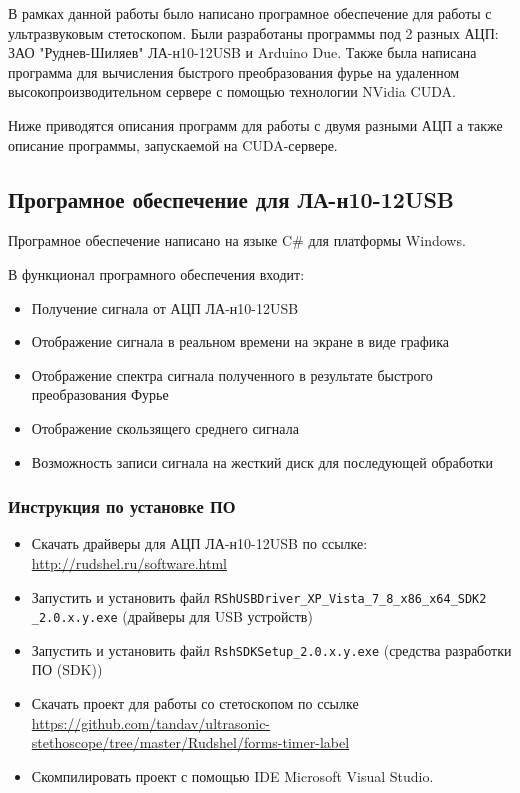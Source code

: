 \documentclass[../paper.tex]{subfiles}
\begin{document}
В рамках данной работы было написано програмное обеспечение для работы с ультразвуковым стетоскопом. Были разработаны программы под 2 разных АЦП: ЗАО "Руднев-Шиляев" ЛА-н10-12USB и Arduino Due. Также была написана программа для вычисления быстрого преобразования фурье на удаленном высокопроизводительном сервере с помощью технологии NVidia CUDA.

Ниже приводятся описания программ для работы с двумя разными АЦП а также описание программы, запускаемой на CUDA-сервере.

\subsection{Програмное обеспечение для ЛА-н10-12USB}

Програмное обеспечение написано на языке C\# для платформы Windows.

В функционал програмного обеспечения входит:
\begin{itemize}
  \item Получение сигнала от АЦП ЛА-н10-12USB
  \item Отображение сигнала в реальном времени на экране в виде графика
  \item Отображение спектра сигнала полученного в результате быстрого преобразования Фурье
  \item Отображение скользящего среднего сигнала
  \item Возможность записи сигнала на жесткий диск для последующей обработки
\end{itemize}

\subsubsection{Инструкция по установке ПО}
\begin{itemize}
  \item Скачать драйверы для АЦП ЛА-н10-12USB по ссылке:\\ \url{http://rudshel.ru/software.html}
  \item Запустить и установить файл \verb|RShUSBDriver_XP_Vista_7_8_x86_x64_SDK2|
  \verb|_2.0.x.y.exe| (драйверы для USB устройств)
  \item Запустить и установить файл \verb|RshSDKSetup_2.0.x.y.exe| (средства разработки ПО (SDK))
  \item Скачать проект для работы со стетоскопом по ссылке \url{https://github.com/tandav/ultrasonic-stethoscope/tree/master/Rudshel/forms-timer-label}
  \item Скомпилировать проект с помощью IDE Microsoft Visual Studio.
\end{itemize}
\end{document}
